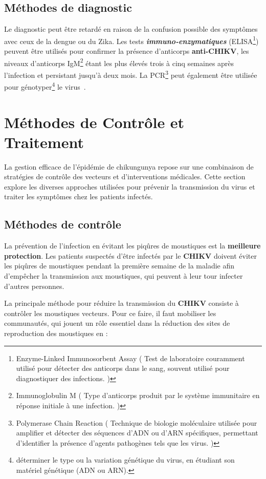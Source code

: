 \subsection{Méthodes de diagnostic}
Le diagnostic peut être retardé en raison de la confusion possible des symptômes avec ceux de la dengue ou du Zika. Les tests \textbf{\textit{immuno-enzymatiques}} (ELISA\footnote{Enzyme-Linked Immunosorbent Assay ( Test de laboratoire couramment utilisé pour détecter des anticorps dans le sang, souvent utilisé pour diagnostiquer des infections. )}) peuvent être utilisés pour confirmer la présence d'anticorps \textbf{anti-CHIKV}, les niveaux d'anticorps IgM\footnote{Immunoglobulin M ( Type d'anticorps produit par le système immunitaire en réponse initiale à une infection. )} étant les plus élevés trois à cinq semaines après l'infection et persistant jusqu'à deux mois. La PCR\footnote{Polymerase Chain Reaction ( Technique de biologie moléculaire utilisée pour amplifier et détecter des séquences d'ADN ou d'ARN spécifiques, permettant d'identifier la présence d'agents pathogènes tels que les virus. )} peut également être utilisée pour génotyper\footnote{déterminer le type ou la variation génétique du virus, en étudiant son matériel génétique (ADN ou ARN).} le virus~\cite{JournalofVirology}.

\section{Méthodes de Contrôle et Traitement}

La gestion efficace de l'épidémie de chikungunya repose sur une combinaison de stratégies de contrôle des vecteurs et d'interventions médicales. Cette section explore les diverses approches utilisées pour prévenir la transmission du virus et traiter les symptômes chez les patients infectés.

\subsection{Méthodes de contrôle}
La prévention de l'infection en évitant les piqûres de moustiques est la \textbf{meilleure protection}. Les patients suspectés d'être infectés par le \textbf{CHIKV} doivent éviter les piqûres de moustiques pendant la première semaine de la maladie afin d'empêcher la transmission aux moustiques, qui peuvent à leur tour infecter d'autres personnes. 

La principale méthode pour réduire la transmission du \textbf{CHIKV} consiste à contrôler les moustiques vecteurs. Pour ce faire, il faut mobiliser les communautés, qui jouent un rôle essentiel dans la réduction des sites de reproduction des moustiques en :


